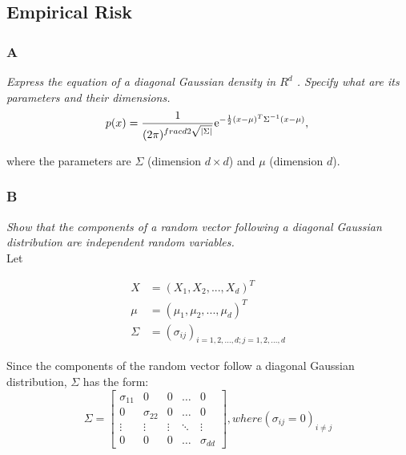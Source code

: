 \documentclass{amsart}
\theoremstyle{definition}
\theoremstyle{remark}
\numberwithin{equation}{section}
\begin{document}
\subsection{Empirical Risk}

\subsubsection{A} 

\textit{Express the equation of a diagonal Gaussian density in $R^d$ . Specify 
            what are its parameters and their dimensions.} \\

\begin{equation}
    p(x) = \frac{1}{(2\pi)^{frac{d}{2} \sqrt{|\Sigma|}}} {\rm e}^{-\frac{1}{2}(x-\mu)^T \Sigma^{-1} (x-\mu)}, \\
\end{equation}

where the parameters are $\Sigma$ (dimension $d \times d$) and $\mu$ (dimension $d$). \\

\subsubsection{B}

\textit{Show that the components of a random vector following a diagonal 
        Gaussian distribution are independent random variables.} \\

Let 

\begin{equation}
    \begin{align}
    X & = (X_1, X_2, ..., X_d)^T \\
    \mu & = (\mu_1, \mu_2, ..., \mu_d)^T \\ 
    \Sigma & = (\sigma_{ij})_{i=1,2,...,d; j=1,2,...,d}
    \end{align}
\end{equation}

Since the components of the random vector follow a diagonal Gaussian distribution,
$\Sigma$ has the form: \\

\begin{equation}
    \Sigma = \begin{bmatrix}
        \sigma_{11} &           0 &      0 & \dots  & 0 \\
                  0 & \sigma_{22} &      0 & \dots  & 0 \\
             \vdots &      \vdots & \vdots & \ddots & \vdots \\
                  0 &           0 &      0 & \dots  & \sigma_{dd}
    \end{bmatrix}, where (\sigma_{ij}=0)_{i \neq j}
\end{equation}
\end{document}
